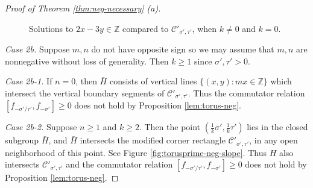 \documentclass[11pt, letterpaper, reqno]{amsart}
\theoremstyle{definition}
\theoremstyle{remark}
\numberwithin{equation}{section}
\newcommand{\ZZ}{\ensuremath{\mathbb{Z}}}
\newcommand{\cCprime}{{\mathcal{C}'}}
\newcommand{\tbetap}{{\sigma'}}
\newcommand{\trhop}{{\tau'}}
\begin{document}
\begin{proof}[Proof of Theorem \ref{thm:neg-necessary} (a)]
\begin{figure}[h]
\begin{center}
\end{center}
\caption{Solutions to $2x-3y\in\ZZ$ compared to $\cCprime_{\tbetap,\trhop}$, when $k\neq 0$ and $k=0$.}
\label{fig:torusprime-pos-slope}
\end{figure} 


{\em Case 2b.} Suppose  $m,n$ do not have opposite sign so we may assume 
that $m,n$ are  nonnegative without loss of generality.
Then $k\geq 1$ since $\tbetap, \trhop >0$.

{\em Case 2b-1.} If $n = 0$, then $\bar{H}$ consists of vertical lines 
$\{(x,y) : mx \in \ZZ \}$ 
which intersect the vertical boundary segments of $\cCprime_{\tbetap,\trhop}$. 
Thus the commutator relation
$[f_{-\tbetap/\trhop}, f_{-\tbetap}]\geq 0$ does not hold 
by Proposition \ref{lem:torus-neg}.


{\em Case 2b-2.} Suppose $n \ge 1$ and $k\geq 2$. 
Then the point $(\frac{1}{k}\tbetap, \frac{1}{k}\trhop)$ 
lies in the closed subgroup $\bar{H}$,
and $\bar{H}$ intersects the modified corner rectangle $\cCprime_{\tbetap, \trhop}$, 
in any open neighborhood of this point. 
See Figure \ref{fig:torusprime-neg-slope}.
Thus $H$ also intersects $\cCprime_{\tbetap, \trhop}$ 
and the commutator relation $[f_{-\tbetap/\trhop}, f_{-\tbetap}]\geq 0$ does not hold
by Proposition \ref{lem:torus-neg}.


\end{proof}
\end{document}
